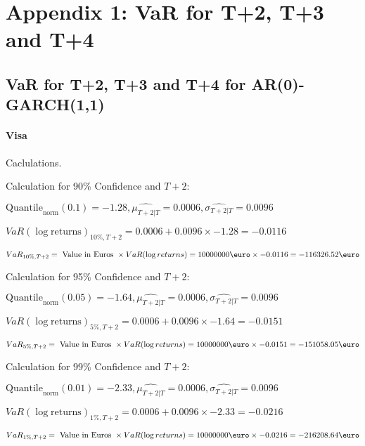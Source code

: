 \section{Appendix 1: VaR for T+2, T+3 and T+4}
    \label{sec:var2to4days}
\subsection{VaR for T+2, T+3 and T+4 for AR(0)-GARCH(1,1)}
\paragraph{Visa} Caclulations.\newline \indent 





Calculation for 90\% Confidence and $T+2$:

\indent\indent $\text{Quantile}_\text{norm}(0.1) = -1.28,\hat{\mu_{T+2|T}} = 0.0006, \hat{\sigma_{T+2|T}} = 0.0096$

\indent\indent $VaR(\log \text{returns})_{10\%, T + 2} = 0.0006 + 0.0096\times-1.28 = -0.0116$

\indent\indent $VaR_{10\%, T + 2} = \text{ Value in Euros } \times VaR(\log returns) = 10 000 000 \text{\euro} \times-0.0116 = -116326.52 \text{\euro}$\newline




Calculation for 95\% Confidence and $T+2$:

\indent\indent $\text{Quantile}_\text{norm}(0.05) = -1.64,\hat{\mu_{T+2|T}} = 0.0006, \hat{\sigma_{T+2|T}} = 0.0096$

\indent\indent $VaR(\log \text{returns})_{5\%, T + 2} = 0.0006 + 0.0096\times-1.64 = -0.0151$

\indent\indent $VaR_{5\%, T + 2} = \text{ Value in Euros } \times VaR(\log returns) = 10 000 000 \text{\euro} \times-0.0151 = -151058.05 \text{\euro}$\newline




Calculation for 99\% Confidence and $T+2$:

\indent\indent $\text{Quantile}_\text{norm}(0.01) = -2.33,\hat{\mu_{T+2|T}} = 0.0006, \hat{\sigma_{T+2|T}} = 0.0096$

\indent\indent $VaR(\log \text{returns})_{1\%, T + 2} = 0.0006 + 0.0096\times-2.33 = -0.0216$

\indent\indent $VaR_{1\%, T + 2} = \text{ Value in Euros } \times VaR(\log returns) = 10 000 000 \text{\euro} \times-0.0216 = -216208.64 \text{\euro}$\newline




